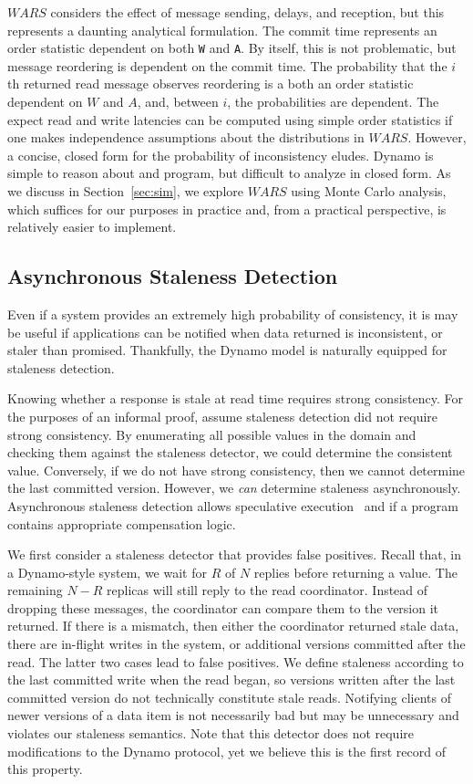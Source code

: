 \documentclass{vldb}
\begin{document}
$WARS$ considers the effect of message sending, delays, and reception,
but this represents a daunting analytical formulation.  The commit
time represents an order statistic dependent on both \texttt{W} and
\texttt{A}.  By itself, this is not problematic, but message
reordering is dependent on the commit time.  The probability that the
$i$th returned read message observes reordering is a both an order
statistic dependent on $W$ and $A$, and, between $i$, the
probabilities are dependent.  The expect read and write latencies can
be computed using simple order statistics if one makes independence
assumptions about the distributions in $WARS$.  However, a concise,
closed form for the probability of inconsistency eludes.  Dynamo is
simple to reason about and program, but difficult to analyze in closed
form.  As we discuss in Section~\ref{sec:sim}, we explore $WARS$ using
Monte Carlo analysis, which suffices for our purposes in practice and,
from a practical perspective, is relatively easier to implement.


\subsection{Asynchronous Staleness Detection}

Even if a system provides an extremely high probability of
consistency, it is may be useful if applications can be notified when
data returned is inconsistent, or staler than promised.  Thankfully,
the Dynamo model is naturally equipped for staleness detection.

Knowing whether a response is stale at read time requires strong
consistency.  For the purposes of an informal proof, assume staleness
detection did not require strong consistency.  By enumerating all
possible values in the domain and checking them against the staleness
detector, we could determine the consistent value.  Conversely, if we
do not have strong consistency, then we cannot determine the last
committed version. However, we \textit{can} determine staleness
asynchronously.  Asynchronous staleness detection allows speculative
execution~\cite{nsdispeculation} and if a program contains appropriate
compensation logic.

We first consider a staleness detector that provides false positives.
Recall that, in a Dynamo-style system, we wait for $R$ of $N$ replies
before returning a value.  The remaining $N-R$ replicas will still
reply to the read coordinator.  Instead of dropping these messages,
the coordinator can compare them to the version it returned.  If there
is a mismatch, then either the coordinator returned stale data, there
are in-flight writes in the system, or additional versions committed
after the read.  The latter two cases lead to false positives.  We
define staleness according to the last committed write when the read
began, so versions written after the last committed version do not
technically constitute stale reads.  Notifying clients of newer
versions of a data item is not necessarily bad but may be unnecessary
and violates our staleness semantics.  Note that this detector does
not require modifications to the Dynamo protocol, yet we believe this
is the first record of this property.
\end{document}
